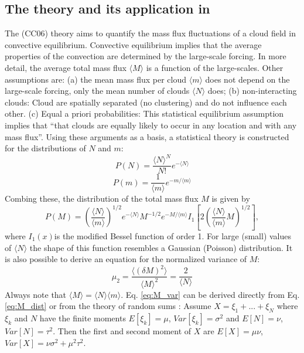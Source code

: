 \documentclass[a4paper, 12pt]{article}
\begin{document}
\subsection{The \cite{Craig2006} theory and its application in \cite{Plant2008}} 
The \cite{Craig2006}(CC06) theory aims to quantify the mass flux fluctuations of a cloud field in convective equilibrium. Convective equilibrium implies that the average properties of the convection are determined by the large-scale forcing. In more detail, the average total mass flux $\langle M \rangle$ is a function of the large-scales. Other assumptions are: (a) the mean mass flux per cloud $\langle m \rangle$ does not depend on the large-scale forcing, only the mean number of clouds $\langle N \rangle$ does; (b) non-interacting clouds: Cloud are spatially separated (no clustering) and do not influence each other. (c) Equal a priori probabilities: This statistical equilibrium assumption implies that ``that clouds are equally likely to occur in any location and with any mass flux''. Using these arguments as a basis, a statistical theory is constructed for the distributions of $N$ and $m$:
\begin{equation} \label{eq:N_dist}
 P(N) = \frac{\langle N \rangle^N}{N!}e^{-\langle N \rangle}
\end{equation}
\begin{equation} \label{eq:m_dist}
 P(m) = \frac{1}{\langle m \rangle}e^{-m/\langle m \rangle}
\end{equation}
Combing these, the distribution of the total mass flux $M$ is given by
\begin{equation} \label{eq:M_dist}
 P(M) = \left( \frac{\langle N \rangle}{\langle m \rangle} \right)^{1/2} e^{-\langle N \rangle} M^{-1/2} e^{-M/\langle m \rangle} I_1\left[ 2 \left( \frac{\langle N \rangle}{\langle m \rangle} M \right)^{1/2} \right],
\end{equation}
where $I_1(x)$is the modified Bessel function of order 1. For large (small) values of $\langle N \rangle$ the shape of this function resembles a Gaussian (Poisson) distribution.   
It is also possible to derive an equation for the normalized variance of $M$:
\begin{equation} \label{eq:M_var}
 \mu_2 = \frac{\langle (\delta M)^2 \rangle}{\langle M \rangle^2} = \frac{2}{\langle N \rangle}
\end{equation}
Always note that $\langle M \rangle = \langle N \rangle \langle m \rangle$. Eq. \ref{eq:M_var} can be derived directly from Eq. \ref{eq:M_dist} or from the theory of random sums \cite[][p.70ff]{Taylor1998}:
Assume $X=\xi_1 + ... + \xi_N$ where $\xi_k$ and $N$ have the finite moments $E[\xi_k]=\mu$, $Var[\xi_k]=\sigma^2$ and $E[N]=\nu$, $Var[N]=\tau^2$. Then the first and second moment of $X$ are $E[X]=\mu\nu$, $Var[X]=\nu\sigma^2 + \mu^2\tau^2$.
\end{document}
